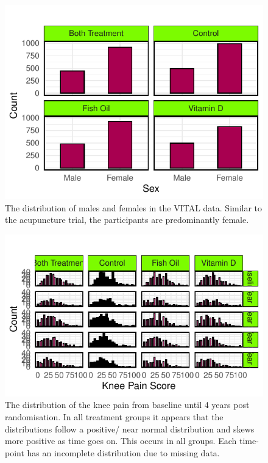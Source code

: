 \documentclass{article}
\newcommand{\pandocbounded}[1]{#1}
\begin{document}
\begin{figure}

{\centering \includegraphics{Final_Report_files/figure-latex/unnamed-chunk-16-1} 

}

\caption{The distribution of males and females in the VITAL data. Similar to the acupuncture trial, the participants are predominantly female.}\label{fig:unnamed-chunk-16}
\end{figure}

\begin{figure}
\centering
\pandocbounded{\includegraphics[keepaspectratio]{Final_Report_files/figure-latex/unnamed-chunk-17-1.pdf}}
\caption{The distribution of the knee pain from baseline until 4 years
post randomisation. In all treatment groups it appears that the
distributions follow a positive/ near normal distribution and skews more
positive as time goes on. This occurs in all groups. Each time-point has
an incomplete distribution due to missing data.}
\end{figure}
\end{document}
